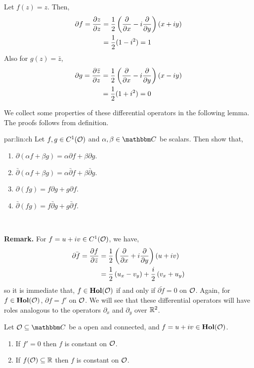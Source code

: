 \documentclass[../ComplexAnalysis_Notes.tex]{subfiles}
\begin{document}
\begin{Eg}{}{}
  Let \(f(z) = z\). Then,
  \begin{align*}
    \partial f = \pdv{z}{z} & = \frac 12 \left( \pdv{x} - i \pdv{y} \right)(x + iy) \\
                            & = \frac 12 (1 - i^2) = 1
  \end{align*}
  Also for \(g(z) = \bar{z}\),
  \begin{align*}
    \partial g = \pdv{\bar{z}}{z} & = \frac 12 \left( \pdv{x} - i \pdv{y} \right)(x - iy) \\
                                  & = \frac 12 (1 + i^2) = 0
  \end{align*}
\end{Eg}
We collect some properties of these differential operators in the following lemma. The proofs follows from definition. 
\begin{Lem}{}{par:lin:ch}
  Let \(f, g \in C^1(\mathcal{O})\) and \(\alpha, \beta \in \C\) be scalars. Then show that,
  \begin{enumerate}
    \item \(\partial(\alpha f + \beta g) =  \alpha \partial f + \beta \partial g\).
    \item \(\bar{\partial}(\alpha f + \beta g) =  \alpha \bar{\partial} f + \beta \bar{\partial} g\).
    \item \(\partial(fg) = f \partial g + g \partial f\).
    \item \(\bar{\partial}(fg) = f \bar{\partial} g + g \bar{\partial} f\).
  \end{enumerate}
\end{Lem}

\

\textbf{Remark.} For \(f = u + iv \in C^1(\mathcal{O})\), we have,
\begin{align*}
  \bar{\partial f} = \pdv{f}{\bar{z}}
   & = \frac 12 \left( \pdv{x} + i \pdv{y} \right)(u + iv)                   \\
   & = \frac 12 \left( u_x - v_y \right) + \frac i2 \left( v_x + u_y \right)
\end{align*}
so it is immediate that, \(f \in \operatorname{\mathbf{Hol}}(\mathcal{O})\) if and only if \(\bar{\partial f} = 0\) on \(\mathcal{O}\). Again, for \(f \in \operatorname{\mathbf{Hol}}(\mathcal{O})\), \(\partial f = f'\) on \(\mathcal{O}\). We will see that these differential operators will have roles analogous to the operators $\partial_x$ and $\partial_y$ over $\mathbb{R}^2$.

\begin{Thm}{}{}
  Let \(\mO \subseteq \C\) be a open and connected, and \(f = u + iv \in \operatorname{\mathbf{Hol}}(\mathcal{O})\).
  \begin{enumerate}
    \item If \(f' = 0\) then \(f\) is constant on \(\mathcal{O}\).
    \item If \(f(\mathcal{O}) \subseteq \mathbb{R}\) then \(f\) is constant on \(\mathcal{O}\).
  \end{enumerate}
\end{Thm}
\end{document}
